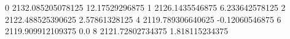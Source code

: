 0 2132.085205078125 12.17529296875
1 2126.1435546875 6.233642578125
2 2122.488525390625 2.57861328125
4 2119.789306640625 -0.12060546875
6 2119.909912109375 0.0
8 2121.72802734375 1.818115234375
